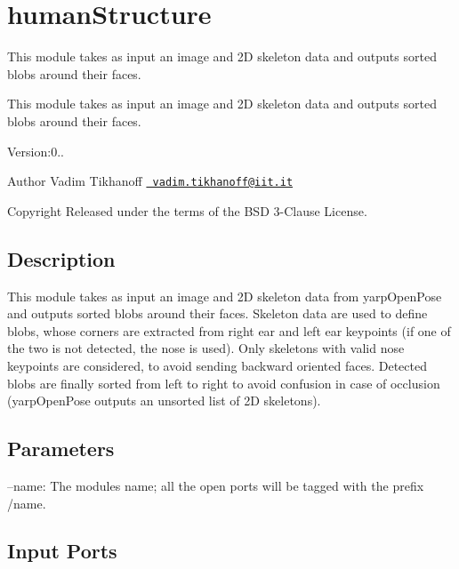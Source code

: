 \section{human\+Structure}
\label{group__humanStructure}


This module takes as input an image and 2D skeleton data and outputs sorted blobs around their faces.  


This module takes as input an image and 2D skeleton data and outputs sorted blobs around their faces. 

Version\+:0.. \begin{DoxyAuthor}{Author}
Vadim Tikhanoff \href{mailto:vadim.tikhanoff@iit.it}{\texttt{ vadim.\+tikhanoff@iit.\+it}} ~\newline
 
\end{DoxyAuthor}
\begin{DoxyCopyright}{Copyright}
Released under the terms of the B\+SD 3-\/Clause License. 
\end{DoxyCopyright}
\hypertarget{group__skeletonViewer_intro_sec}{}\subsection{Description}\label{group__skeletonViewer_intro_sec}
This module takes as input an image and 2D skeleton data from yarp\+Open\+Pose and outputs sorted blobs around their faces. Skeleton data are used to define blobs, whose corners are extracted from right ear and left ear keypoints (if one of the two is not detected, the nose is used). Only skeletons with valid nose keypoints are considered, to avoid sending backward oriented faces. Detected blobs are finally sorted from left to right to avoid confusion in case of occlusion (yarp\+Open\+Pose outputs an unsorted list of 2D skeletons).\hypertarget{group__skeletonViewer_parameters_sec}{}\subsection{Parameters}\label{group__skeletonViewer_parameters_sec}

\begin{DoxyItemize}
\item --name\+: The module\textquotesingle{}s name; all the open ports will be tagged with the prefix /name. 
\end{DoxyItemize}\hypertarget{group__skeletonViewer_inputports_sec}{}\subsection{Input Ports}\label{group__skeletonViewer_inputports_sec}

